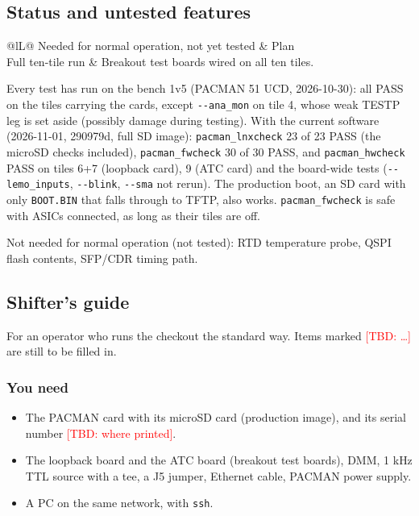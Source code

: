 \documentclass[11pt]{article}
\newcommand{\tbd}[1]{\textcolor{red}{[TBD: #1]}}
\newcommand{\opt}[1]{\texttt{-{}-#1}}
\begin{document}
\subsection{Status and untested features}\label{sec:status}

\begin{center}
\begin{tabularx}{\linewidth}{@{}lL@{}}
\toprule
Needed for normal operation, not yet tested & Plan \\
\midrule
Full ten-tile run & Breakout test boards wired on all ten tiles. \\
\bottomrule
\end{tabularx}
\end{center}

\noindent Every test has run on the bench 1v5 (PACMAN 51 UCD, 2026-10-30): all PASS on the tiles carrying the
cards, except \opt{ana\_mon} on tile 4, whose weak TESTP leg is set aside (possibly damage during testing).  With the
current software (2026-11-01, 290979d, full SD image): \texttt{pacman\_lnxcheck} 23 of 23 PASS (the microSD checks
included), \texttt{pacman\_fwcheck} 30 of 30 PASS, and \texttt{pacman\_hwcheck} PASS on tiles 6+7 (loopback card), 9
(ATC card) and the board-wide tests (\opt{lemo\_inputs}, \opt{blink}, \opt{sma} not rerun).  The production boot,
an SD card with only \texttt{BOOT.BIN} that falls through to TFTP, also works.  \texttt{pacman\_fwcheck} is safe with
ASICs connected, as long as their tiles are off.

\noindent Not needed for normal operation (not tested): RTD temperature probe, QSPI flash contents, SFP/CDR timing path.

\subsection{Shifter's guide}

For an operator who runs the checkout the standard way.  Items marked \tbd{\ldots} are still to be filled in.

\subsubsection*{You need}
\begin{itemize}
\item The PACMAN card with its microSD card (production image), and its serial number \tbd{where printed}.
\item The loopback board and the ATC board (breakout test boards), DMM, 1 kHz TTL source with a tee, a J5 jumper, Ethernet
  cable, PACMAN power supply.
\item A PC on the same network, with \texttt{ssh}.
\end{itemize}
\end{document}
